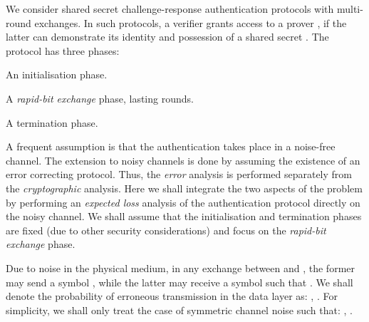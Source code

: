 \documentclass[a4paper]{article}
\theoremstyle{plain} \newtheorem{remark}{Remark}
\theoremstyle{plain} \newtheorem{definition}{Definition}
\theoremstyle{plain} \newtheorem{example}{Example}
\theoremstyle{plain} \newtheorem{assumption}{Assumption}
\theoremstyle{plain} \newtheorem{conjecture}{Conjecture}
\theoremstyle{plain} \newtheorem{theorem}{Theorem}
\theoremstyle{plain} \newtheorem{proposition}{Proposition}
\theoremstyle{plain} \newtheorem{lemma}{Lemma}
\theoremstyle{plain} \newtheorem{corollary}{Corollary}
\begin{document}
We consider shared secret challenge-response authentication protocols
with multi-round exchanges.  In such protocols, a verifier 
grants access to a prover , if the latter can demonstrate its
identity  and possession of a shared secret . The
protocol has three phases:
\begin{inparaenum}[(i)]
\item An initialisation phase.
\item A \textit{rapid-bit exchange} phase, lasting  rounds.
\item A termination phase.
\end{inparaenum}
A frequent assumption is that the authentication takes place in a
noise-free channel. The extension to noisy channels is done by
assuming the existence of an error correcting protocol. Thus, the {\em
  error} analysis is performed separately from the {\em cryptographic}
analysis. Here we shall integrate the two aspects of the problem by
performing an {\em expected loss} analysis of the authentication
protocol directly on the noisy channel. We shall assume that the
initialisation and termination phases are fixed (due to other security
considerations) and focus on the \textit{rapid-bit exchange} phase.

Due to noise in the physical medium, in any exchange between 
and , the former may send a symbol , while the
latter may receive a symbol  such that . We
shall denote the probability of erroneous transmission in the data
layer as: , .
For simplicity, we shall only treat the case of symmetric channel
noise such that: ,
.
\end{document}
